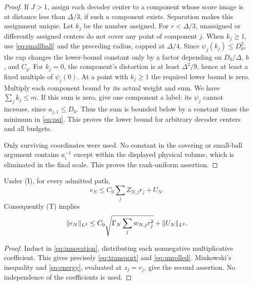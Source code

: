 \begin{proof}
If $J>1$, assign each decoder center to a component whose score image is at distance less than $\Delta/3$, if such a component exists. Separation makes this assignment unique. Let $k_j$ be the number assigned. For $r<\Delta/3$, unassigned or differently assigned centers do not cover any point of component $j$. When $k_j\ge1$, use \eqref{eq:smallball} and the preceding radius, capped at $\Delta/4$. Since $\psi_j(k_j)\le D_0^2$, the cap changes the lower-bound constant only by a factor depending on $D_0/\Delta$, $b$, and $C_g$. For $k_j=0$, the component's distortion is at least $\Delta^2/9$, hence at least a fixed multiple of $\psi_j(0)$. At a point with $k_j\ge1$ the required lower bound is zero. Multiply each component bound by its actual weight and sum. We have $\sum_jk_j\le m$. If this sum is zero, give one component a label: its $\psi_j$ cannot increase, since $a_{j,1}\le D_0$. Thus the sum is bounded below by a constant times the minimum in \eqref{eq:psi}. This proves the lower bound for arbitrary decoder centers and all budgets.

Only surviving coordinates were used. No constant in the covering or small-ball argument contains $a_i^{-1}$ except within the displayed physical volume, which is eliminated in the final scale. This proves the rank-uniform assertion.
\end{proof}

\begin{lemma}\label{lem:transport}
Under \textup{(I)}, for every admitted path,
\begin{equation}\label{eq:unrolled}
 e_N\le C_0\sum_jZ_{N,j}r_j+U_N.
\end{equation}
Consequently \textup{(T)} implies
\[
 \lVert e_N\rVert_{L^2}\le C_0\sqrt{\Gamma_N\sum_jw_{N,j}r_j^2}
                      +\lVert U_N\rVert_{L^2}.
\]
\end{lemma}
\begin{proof}
Induct in \eqref{eq:innovation}, distributing each nonnegative multiplicative coefficient. This gives precisely \eqref{eq:transport} and \eqref{eq:unrolled}. Minkowski's inequality and \eqref{eq:energy}, evaluated at $z_j=r_j$, give the second assertion. No independence of the coefficients is used.
\end{proof}

